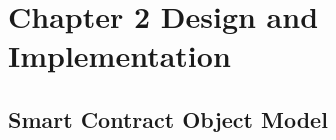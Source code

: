 \chapter{Chapter 2 Design and Implementation}






% 

\section{Smart Contract Object Model}

  




